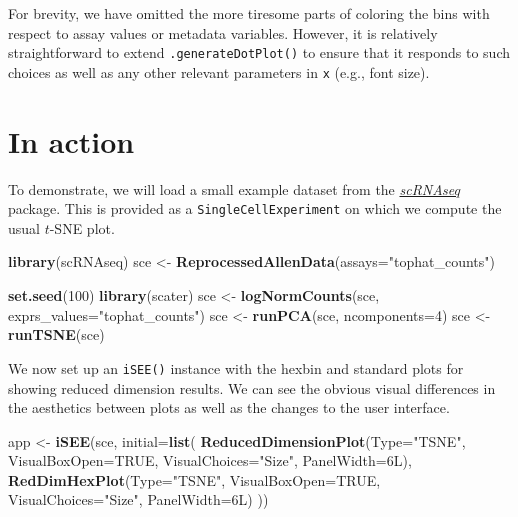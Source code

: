 \documentclass[
]{book}
\newenvironment{Shaded}{\begin{snugshade}}{\end{snugshade}}
\newcommand{\DataTypeTok}[1]{\textcolor[rgb]{0.13,0.29,0.53}{#1}}
\newcommand{\DecValTok}[1]{\textcolor[rgb]{0.00,0.00,0.81}{#1}}
\newcommand{\KeywordTok}[1]{\textcolor[rgb]{0.13,0.29,0.53}{\textbf{#1}}}
\newcommand{\NormalTok}[1]{#1}
\newcommand{\OtherTok}[1]{\textcolor[rgb]{0.56,0.35,0.01}{#1}}
\newcommand{\StringTok}[1]{\textcolor[rgb]{0.31,0.60,0.02}{#1}}
\begin{document}
For brevity, we have omitted the more tiresome parts of coloring the bins with respect to assay values or metadata variables.
However, it is relatively straightforward to extend \texttt{.generateDotPlot()} to ensure that it responds to such choices as well as any other relevant parameters in \texttt{x} (e.g., font size).

\hypertarget{in-action}{%
\section{In action}\label{in-action}}

To demonstrate, we will load a small example dataset \citep{tasic2016adult} from the \emph{\href{https://bioconductor.org/packages/3.11/scRNAseq}{scRNAseq}} package.
This is provided as a \texttt{SingleCellExperiment} on which we compute the usual \(t\)-SNE plot.

\begin{Shaded}
\begin{Highlighting}[]
\KeywordTok{library}\NormalTok{(scRNAseq)}
\NormalTok{sce <-}\StringTok{ }\KeywordTok{ReprocessedAllenData}\NormalTok{(}\DataTypeTok{assays=}\StringTok{"tophat_counts"}\NormalTok{)}

\KeywordTok{set.seed}\NormalTok{(}\DecValTok{100}\NormalTok{)}
\KeywordTok{library}\NormalTok{(scater)}
\NormalTok{sce <-}\StringTok{ }\KeywordTok{logNormCounts}\NormalTok{(sce, }\DataTypeTok{exprs_values=}\StringTok{"tophat_counts"}\NormalTok{)}
\NormalTok{sce <-}\StringTok{ }\KeywordTok{runPCA}\NormalTok{(sce, }\DataTypeTok{ncomponents=}\DecValTok{4}\NormalTok{)}
\NormalTok{sce <-}\StringTok{ }\KeywordTok{runTSNE}\NormalTok{(sce)}
\end{Highlighting}
\end{Shaded}

We now set up an \texttt{iSEE()} instance with the hexbin and standard plots for showing reduced dimension results.
We can see the obvious visual differences in the aesthetics between plots as well as the changes to the user interface.

\begin{Shaded}
\begin{Highlighting}[]
\NormalTok{app <-}\StringTok{ }\KeywordTok{iSEE}\NormalTok{(sce, }\DataTypeTok{initial=}\KeywordTok{list}\NormalTok{(}
    \KeywordTok{ReducedDimensionPlot}\NormalTok{(}\DataTypeTok{Type=}\StringTok{"TSNE"}\NormalTok{, }\DataTypeTok{VisualBoxOpen=}\OtherTok{TRUE}\NormalTok{, }\DataTypeTok{VisualChoices=}\StringTok{"Size"}\NormalTok{, }\DataTypeTok{PanelWidth=}\NormalTok{6L),}
    \KeywordTok{RedDimHexPlot}\NormalTok{(}\DataTypeTok{Type=}\StringTok{"TSNE"}\NormalTok{, }\DataTypeTok{VisualBoxOpen=}\OtherTok{TRUE}\NormalTok{, }\DataTypeTok{VisualChoices=}\StringTok{"Size"}\NormalTok{, }\DataTypeTok{PanelWidth=}\NormalTok{6L)}
\NormalTok{))}
\end{Highlighting}
\end{Shaded}
\end{document}

